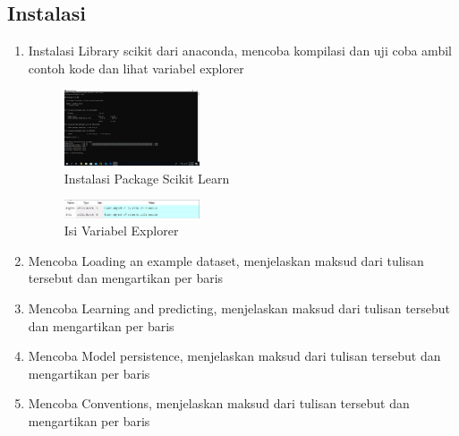 \subsection{Instalasi}
\begin{enumerate}
	\item Instalasi Library scikit dari anaconda, mencoba kompilasi dan uji coba ambil contoh kode dan lihat variabel explorer
	\hfill\break
	\begin{figure}[H]
		\includegraphics[width=4cm]{figures/1174053/1.png}
		\centering
		\caption{Instalasi Package Scikit Learn}
	\end{figure}
	\begin{figure}[H]
		\includegraphics[width=4cm]{figures/1174053/2.png}
		\centering
		\caption{Isi Variabel Explorer}
	\end{figure}
	\item Mencoba Loading an example dataset, menjelaskan maksud dari tulisan tersebut dan mengartikan           		  per baris
	\hfill\break
	
	\item Mencoba Learning and predicting, menjelaskan maksud dari tulisan tersebut dan mengartikan per  			  baris
	\hfill\break
	
	\item  Mencoba Model persistence, menjelaskan maksud dari tulisan tersebut dan mengartikan per baris
	\hfill\break
	
	\item Mencoba Conventions, menjelaskan maksud dari tulisan tersebut dan mengartikan per baris
	\hfill\break
	
\end{enumerate}

